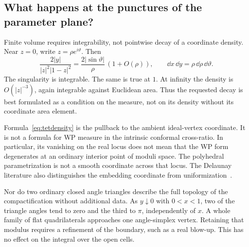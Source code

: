 \subsection{What happens at the punctures of the parameter plane?}

Finite volume requires integrability, not pointwise decay of a coordinate
density. Near $z=0$, write $z=\rho e^{i\vartheta}$. Then
\[
 \frac{2|y|}{|z|^2|1-z|^2}
 =\frac{2|\sin\vartheta|}{\rho}\,(1+O(\rho)),
 \qquad \dd x\,\dd y=\rho\,\dd\rho\,\dd\vartheta.
\]
The singularity is integrable. The same is true at $1$. At infinity the
density is $O(|z|^{-3})$, again integrable against Euclidean area. Thus the
requested decay is best formulated as a condition on the measure, not on
its density without its coordinate area element.

\begin{remark}
Formula~\eqref{eq:tetdensity} is the pullback to the ambient ideal-vertex
coordinate. It is not a formula for WP measure in the intrinsic conformal
cross-ratio. In particular, its vanishing on the real locus does not mean
that the WP form degenerates at an ordinary interior point of moduli space.
The polyhedral parametrization is not a smooth coordinate across that locus.
The Delaunay literature also distinguishes the embedding coordinate from
uniformization~\cite[Section 3.3.1]{CDE}.
\end{remark}

Nor do two ordinary closed angle triangles describe the full topology of
the compactification without additional data. As $y\downarrow0$ with
$0<x<1$, two of the triangle angles tend to zero and the third to $\pi$,
independently of $x$. A whole family of flat quadrilaterals approaches one
angle-simplex vertex. Retaining that modulus requires a refinement of the
boundary, such as a real blow-up. This has no effect on the integral over
the open cells.

